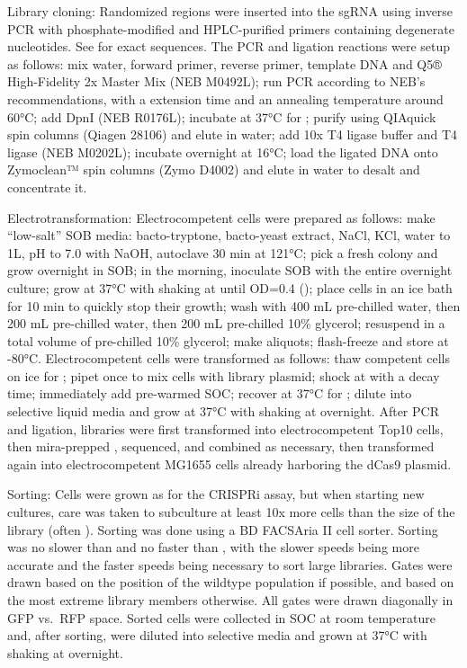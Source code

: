 \documentclass[10pt,oneside]{article}
\begin{document}
Library cloning: Randomized regions were inserted into the sgRNA using inverse PCR with phosphate-modified and HPLC-purified primers containing degenerate nucleotides.  See  for exact sequences.  The PCR and ligation reactions were setup as follows: mix  water,   forward primer,   reverse primer,   template DNA and  Q5® High-Fidelity 2x Master Mix (NEB M0492L); run PCR according to NEB's recommendations, with a  extension time and an annealing temperature around 60°C; add   DpnI (NEB R0176L); incubate at 37°C for ; purify using QIAquick spin columns (Qiagen 28106) and elute in  water; add  10x T4 ligase buffer and   T4 ligase (NEB M0202L); incubate overnight at 16°C; load the ligated DNA onto Zymoclean™ spin columns (Zymo D4002) and elute in  water to desalt and concentrate it.

Electrotransformation: Electrocompetent cells were prepared as follows: make ``low-salt'' SOB media:  bacto-tryptone,  bacto-yeast extract,   NaCl,   KCl, water to 1L, pH to 7.0 with NaOH, autoclave 30 min at 121°C; pick a fresh colony and grow overnight in  SOB; in the morning, inoculate  SOB with the entire overnight culture; grow at 37°C with shaking at  until OD=0.4 (); place cells in an ice bath for 10 min to quickly stop their growth; wash with 400 mL pre-chilled water, then 200 mL pre-chilled water, then 200 mL pre-chilled 10\% glycerol; resuspend in a total volume of  pre-chilled 10\% glycerol; make  aliquots; flash-freeze and store at -80°C.  Electrocompetent cells were transformed as follows: thaw competent cells on ice for ; pipet once to mix cells with   library plasmid; shock at  with a  decay time; immediately add  pre-warmed SOC; recover at 37°C for ; dilute into selective liquid media and grow at 37°C with shaking at  overnight.  After PCR and ligation, libraries were first transformed into electrocompetent Top10 cells, then mira-prepped \autocite{pronobis2016}, sequenced, and combined as necessary, then transformed again into electrocompetent MG1655 cells already harboring the dCas9 plasmid.

Sorting: Cells were grown as for the CRISPRi assay, but when starting new  cultures, care was taken to subculture at least 10x more cells than the size of the library (often ).  Sorting was done using a BD FACSAria II cell sorter.  Sorting was no slower than  and no faster than , with the slower speeds being more accurate and the faster speeds being necessary to sort large libraries.  Gates were drawn based on the position of the wildtype population if possible, and based on the most extreme library members otherwise.  All gates were drawn diagonally in GFP vs.\ RFP space.  Sorted cells were collected in  SOC at room temperature and, after sorting, were diluted into selective media and grown at 37°C with shaking at  overnight.
\end{document}
